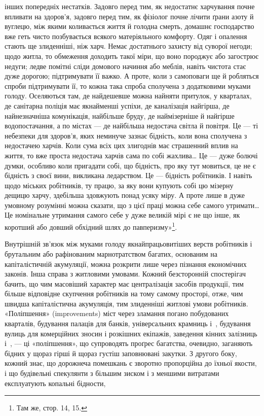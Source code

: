 \parcont{}  %
інших попередніх нестатків. Задовго перед тим, як недостатнє
харчування почне впливати на здоров’я, задовго перед тим, як
фізіолог почне лічити ґрани азоту й вуглецю, між якими коливається
життя й голодна смерть, домашнє господарство вже геть
чисто позбувається всякого матеріяльного комфорту. Одяг і
опалення стають ще злиденніші, ніж харч. Немає достатнього
захисту від суворої негоди; щодо житла, то обмеження доходить
такої міри, що воно породжує або загострює недуги; ледве помітні
сліди домового начиння або меблів, навіть чистота стає
дуже дорогою; підтримувати її важко. А проте, коли з самоповаги
ще й робляться спроби підтримувати її, то кожна така спроба
сполучена з додатковими муками голоду. Оселяються там, де
найдешевше можна найняти притулок, у кварталах, де санітарна
поліція має якнайменші успіхи, де каналізація найгірша, де
найнезначніша комунікація, найбільше бруду, де наймізерніше
й найгірше водопостачання, а по містах — де найбільша недостача
світла й повітря. Це — ті небезпеки для здоров’я, яких
неминуче зазнає бідність, коли вона сполучена з недостачею харчів.
Коли сума всіх цих злигоднів має страшенний вплив на
життя, то вже проста недостача харчів сама по собі жахлива\dots{}
Це — дуже болючі думки, особливо коли пригадати собі, що
бідність, про яку тут мовиться, це не є бідність з своєї вини,
викликана ледарством. Це — бідність робітників. І навіть щодо
міських робітників, ту працю, за яку вони купують собі цю мізерну
дещицю харчу, здебільша здовжують понад усяку міру.
А проте лише в дуже умовному розумінні можна сказати, що
з цієї праці можна себе самого утримати\dots{} Це номінальне утримання
самого себе у дуже великій мірі є не що інше, як коротший
або довший обхідний шлях до павперизму»\footnote{
Там же, стор. 14, 15.
}.

Внутрішній зв’язок між муками голоду якнайпрацьовитіших
верств робітників і брутальним або рафінованим марнотратством
багатих, основаним на капіталістичній акумуляції, можна
розкрити лише через пізнання економічних законів. Інша справа
з житловими умовами. Кожний безсторонній спостерігач бачить,
що чим масовіший характер має централізація засобів продукції,
тим більше відповідне скупчення робітників на тому самому
просторі, отже, чим швидша капіталістична акумуляція, тим
злиденніші житлові умови робітників. «Поліпшення» (improvements)
міст через зламання погано побудованих кварталів,
будування палаців для банків, універсальних крамниць і~,
будування вулиць для комерційних зносин і розкішних екіпажів,
заведення кінних залізниць і~, — ці «поліпшення»,
що супроводять проґрес багатства, очевидно, заганяють бідних
у щораз гірші й щораз густіш заповнювані закутки. З другого
боку, кожний знає, що дорожнеча помешкань є зворотно пропорційна
до їхньої якости, і що будівельні спекулянти з більшим
зиском і з меншими витратами експлуатують копальні бідности,
\parbreak{}  %
